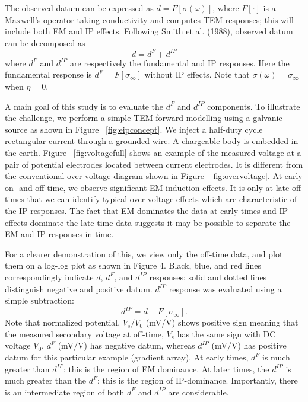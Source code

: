 \documentclass[paper]{geophysics}
\newcommand{\siginf}{\sigma_\infty}
\newcommand{\dip}{d^{IP}}
\begin{document}
The observed datum can be expressed as $d=F[\sigma(\omega)]$, where $F[\cdot]$ is a Maxwell’s operator taking  conductivity and computes TEM responses; this will include both EM and IP effects. Following Smith et al. (1988), observed datum can be decomposed as
\begin{equation}
  d = d^F + \dip
  \label{eq:totaldata}
\end{equation}
where $d^F$ and $\dip$ are respectively the fundamental and IP responses. Here the fundamental response is $d^F = F[\siginf]$ without IP effects. Note that $\sigma(\omega)=\siginf$ when $\eta=0$.

A main goal of this study is to evaluate the $d^F$ and $\dip$ components. To illustrate the challenge, we perform a simple TEM forward modelling using a galvanic source as shown in Figure ~\ref{fig:eipconcept}. We inject a half-duty cycle rectangular current through a grounded wire. A chargeable body is embedded in the earth.  Figure ~\ref{fig:voltagefull} shows an example of the measured voltage at a pair of potential electrodes located between current electrodes. It is different from the conventional over-voltage diagram shown in Figure ~\ref{fig:overvoltage}. At early on- and off-time, we observe significant EM induction effects. It is only at late off-times that we can identify typical over-voltage effects which are characteristic of the IP responses. The fact that EM dominates the data at early times and IP effects dominate the late-time data suggests it may be possible to separate the EM and IP responses in time.

For a clearer demonstration of this, we view only the off-time data, and plot them on a log-log plot as shown in Figure 4. Black, blue, and red lines correspondingly indicate $d$, $d^F$, and $\dip$ responses; solid and dotted lines distinguish negative and positive datum. $\dip$ response was evaluated using a simple subtraction:
\begin{equation}
  \dip = d - F[\siginf].
  \label{eq:ipdata}
\end{equation}
Note that normalized potential, $V_s/V_0$ (mV/V) shows positive sign meaning that the measured secondary voltage at off-time, $V_s$ has the same sign with DC voltage $V_0$. $d^F$ (mV/V) has negative datum, whereas $\dip$ (mV/V)  has positive datum for this particular example (gradient array). At early times, $d^F$ is much greater than $\dip$; this is the region of EM dominance.  At later times, the $\dip$ is much greater than the $d^F$; this is the region of IP-dominance. Importantly, there is an intermediate region  of both $d^F$ and $\dip$ are considerable.
\end{document}
